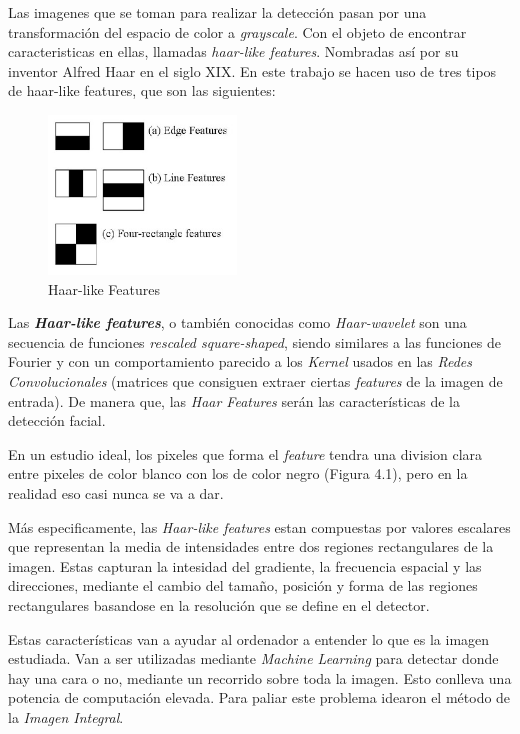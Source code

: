 Las imagenes que se toman para realizar la detección pasan por una transformación del espacio de color a \textit{grayscale}. Con el objeto de encontrar caracteristicas en ellas, llamadas \textit{haar-like features}. Nombradas así por su inventor Alfred Haar en el siglo XIX. En este trabajo se hacen uso de tres tipos de haar-like features, que son las siguientes:

\begin{figure}[htp]
	\centering
	\includegraphics[width=5cm]{imagenes/haar-like.jpeg}
	\caption{Haar-like Features}
	\label{fig:haarLike}
\end{figure}

Las \textbf{\textit{Haar-like features}}, o también conocidas como \textit{Haar-wavelet} son una secuencia de funciones \textit{rescaled square-shaped}, siendo similares a las funciones de Fourier y con un comportamiento parecido a los \textit{Kernel} usados en las \textit{Redes Convolucionales} (matrices que consiguen extraer ciertas \textit{features} de la imagen de entrada). De manera que, las \textit{Haar Features} serán las características de la detección facial.

En un estudio ideal, los pixeles que forma el \textit{feature} tendra una division clara entre pixeles de color blanco con los de color negro (Figura 4.1), pero en la realidad eso casi nunca se va a dar.

Más especificamente, las \textit{Haar-like features} estan compuestas por valores escalares que representan la media de intensidades entre dos regiones rectangulares de la imagen. Estas capturan la intesidad del gradiente, la frecuencia espacial y las direcciones, mediante el cambio del tamaño, posición y forma de las regiones rectangulares basandose en la resolución que se define en el detector. \cite{haar-like}

Estas características van a ayudar al ordenador a entender lo que es la imagen estudiada. Van a ser utilizadas mediante \textit{Machine Learning} para detectar donde hay una cara o no, mediante un recorrido sobre toda la imagen. Esto conlleva una potencia de computación elevada. Para paliar este problema idearon el método de la \textit{Imagen Integral}.

